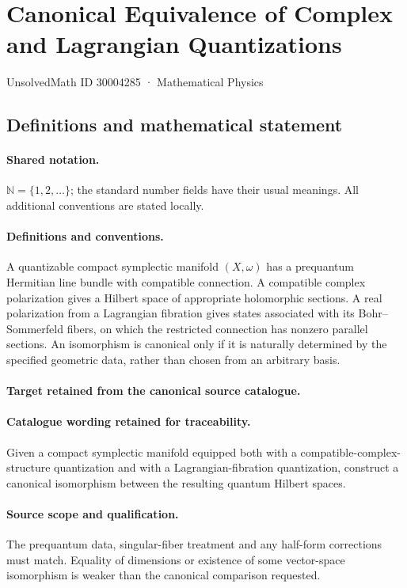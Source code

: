 \documentclass[11pt]{article}
\begin{document}
\setcounter{section}{30004284}
\section{Canonical Equivalence of Complex and Lagrangian Quantizations}\label{30004285}
{\small UnsolvedMath ID 30004285 · Mathematical Physics}
\subsection{Definitions and mathematical statement}

\paragraph{Shared notation.}$\mathbb N=\{1,2,\ldots\}$; the standard number fields have their usual meanings. All additional conventions are stated locally.


\paragraph{Definitions and conventions.}
A quantizable compact symplectic manifold $(X,\omega)$ has a prequantum Hermitian line bundle with compatible connection. A compatible complex polarization gives a Hilbert space of appropriate holomorphic sections. A real polarization from a Lagrangian fibration gives states associated with its Bohr--Sommerfeld fibers, on which the restricted connection has nonzero parallel sections. An isomorphism is canonical only if it is naturally determined by the specified geometric data, rather than chosen from an arbitrary basis.

\paragraph{Target retained from the canonical source catalogue.}
\paragraph{Catalogue wording retained for traceability.}
Given a compact symplectic manifold equipped both with a compatible-complex-structure quantization and with a Lagrangian-fibration quantization, construct a canonical isomorphism between the resulting quantum Hilbert spaces.

\paragraph{Source scope and qualification.}
The prequantum data, singular-fiber treatment and any half-form corrections must match. Equality of dimensions or existence of some vector-space isomorphism is weaker than the canonical comparison requested.
\end{document}
